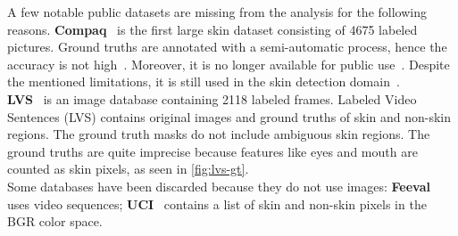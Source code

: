 \begin{table}[h]
    \centering
  \caption{%
    Common Datasets used in Skin Detection\\
    \textsuperscript{1}The  column reports either the ethnic diversity cited in the corresponding papers or the labels utilized for the skin tone values, in case they are present.
  }
  \label{tab:dataset_table}
\end{table}

\noindent A few notable public datasets are missing from the analysis for the following reasons.
\textbf{Compaq}~\cite{jones2002statistical} is the first large skin dataset consisting of 4675 labeled pictures. Ground truths are annotated with a semi-automatic process, hence the accuracy is not high~\cite{mahmoodi2015sdd}. Moreover, it is no longer available for public use~\cite{ruiz2006skindiff}. Despite the mentioned limitations, it is still used in the skin detection domain~\cite{brancati2017human, dourado2019domain}.\\
\textbf{LVS}~\cite{jones2002statistical} is an image database containing 2118 labeled frames. Labeled Video Sentences (LVS) contains original images and ground truths of skin and non-skin regions. The ground truth masks do not include ambiguous skin regions. The ground truths are quite imprecise because features like eyes and mouth are counted as skin pixels, as seen in \autoref{fig:lvs-gt}.\\
Some databases have been discarded because they do not use images: 
\textbf{Feeval}~\cite{stottinger2009skin} uses video sequences;  \textbf{UCI}~\cite{bhatt2009efficient} contains a list of skin and non-skin pixels in the BGR color space.

